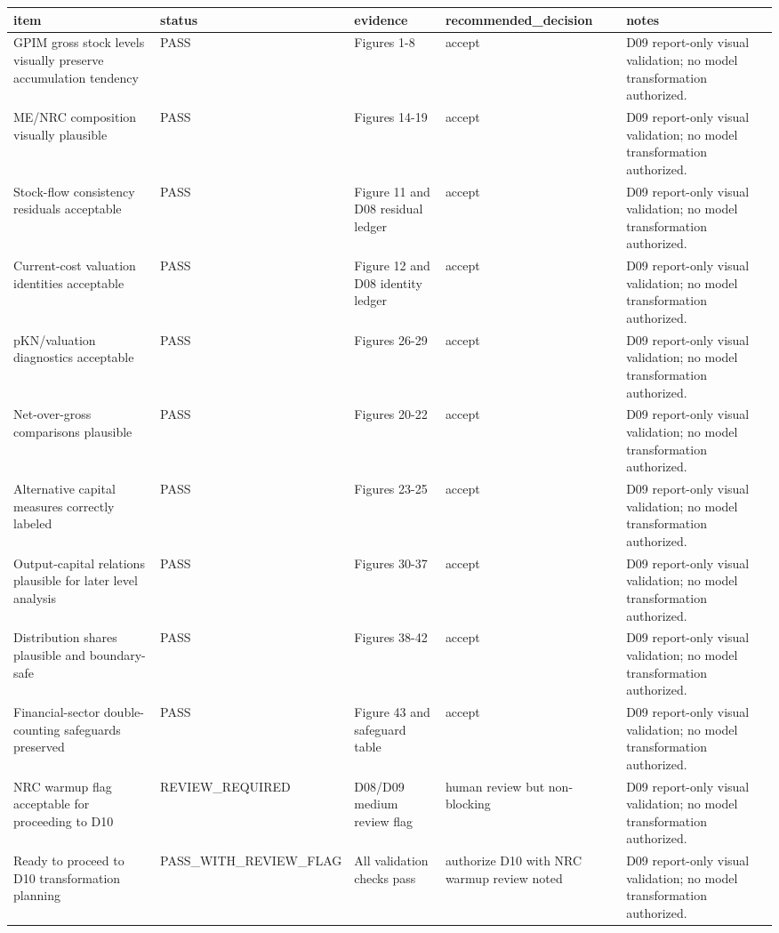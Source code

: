 
\begin{tabular}{lllll}
\toprule
item & status & evidence & recommended\_decision & notes\\
\midrule
GPIM gross stock levels visually preserve accumulation tendency & PASS & Figures 1-8 & accept & D09 report-only visual validation; no model transformation authorized.\\
ME/NRC composition visually plausible & PASS & Figures 14-19 & accept & D09 report-only visual validation; no model transformation authorized.\\
Stock-flow consistency residuals acceptable & PASS & Figure 11 and D08 residual ledger & accept & D09 report-only visual validation; no model transformation authorized.\\
Current-cost valuation identities acceptable & PASS & Figure 12 and D08 identity ledger & accept & D09 report-only visual validation; no model transformation authorized.\\
pKN/valuation diagnostics acceptable & PASS & Figures 26-29 & accept & D09 report-only visual validation; no model transformation authorized.\\
\addlinespace
Net-over-gross comparisons plausible & PASS & Figures 20-22 & accept & D09 report-only visual validation; no model transformation authorized.\\
Alternative capital measures correctly labeled & PASS & Figures 23-25 & accept & D09 report-only visual validation; no model transformation authorized.\\
Output-capital relations plausible for later level analysis & PASS & Figures 30-37 & accept & D09 report-only visual validation; no model transformation authorized.\\
Distribution shares plausible and boundary-safe & PASS & Figures 38-42 & accept & D09 report-only visual validation; no model transformation authorized.\\
Financial-sector double-counting safeguards preserved & PASS & Figure 43 and safeguard table & accept & D09 report-only visual validation; no model transformation authorized.\\
\addlinespace
NRC warmup flag acceptable for proceeding to D10 & REVIEW\_REQUIRED & D08/D09 medium review flag & human review but non-blocking & D09 report-only visual validation; no model transformation authorized.\\
Ready to proceed to D10 transformation planning & PASS\_WITH\_REVIEW\_FLAG & All validation checks pass & authorize D10 with NRC warmup review noted & D09 report-only visual validation; no model transformation authorized.\\
\bottomrule
\end{tabular}
